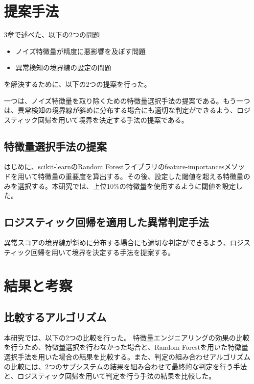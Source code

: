 \documentclass{css}
\begin{document}
\section{提案手法}
3章で述べた、以下の2つの問題
\begin{itemize}
    \item ノイズ特徴量が精度に悪影響を及ぼす問題
    \item 異常検知の境界線の設定の問題
\end{itemize}
を解決するために、以下の2つの提案を行った。

一つは、ノイズ特徴量を取り除くための特徴量選択手法の提案である。もう一つは、異常検知の境界線が斜めに分布する場合にも適切な判定ができるよう、ロジスティック回帰を用いて境界を決定する手法の提案である。

\subsection{特徴量選択手法の提案}   
はじめに、scikit-learnのRandom Forestライブラリのfeature-importancesメソッドを用いて特徴量の重要度を算出する。その後、設定した閾値を超える特徴量のみを選択する。本研究では、上位10\%の特徴量を使用するように閾値を設定した。


\subsection{ロジスティック回帰を適用した異常判定手法}
異常スコアの境界線が斜めに分布する場合にも適切な判定ができるよう、ロジスティック回帰を用いて境界を決定する手法を提案する。


\section{結果と考察}

\subsection{比較するアルゴリズム}

本研究では、以下の2つの比較を行った。
特徴量エンジニアリングの効果の比較を行うため、特徴量選択を行わなかった場合と、Random Forestを用いた特徴量選択手法を用いた場合の結果を比較する。また、判定の組み合わせアルゴリズムの比較には、2つのサブシステムの結果を組み合わせて最終的な判定を行う手法と、ロジスティック回帰を用いて判定を行う手法の結果を比較した。
\end{document}

